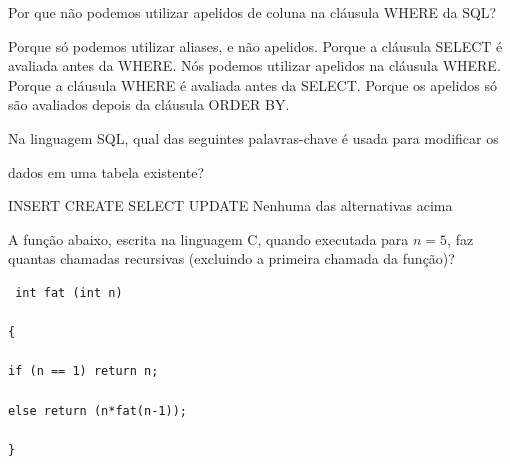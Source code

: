 \documentclass[12pt, addpoints]{exam}
\begin{document}
\begin{questions}
\question

Por que não podemos utilizar apelidos de coluna na cláusula WHERE da SQL?
\begin{choices}
\choice Porque só podemos utilizar aliases, e não apelidos.
\choice Porque a cláusula SELECT é avaliada antes da WHERE.
\choice Nós podemos utilizar apelidos na cláusula WHERE.
\choice Porque a cláusula WHERE é avaliada antes da SELECT.
\choice Porque os apelidos só são avaliados depois da cláusula ORDER BY.
\end{choices}

\question

Na linguagem SQL, qual das seguintes palavras-chave é usada para modificar os

dados em uma tabela existente?


\begin{choices}
\choice INSERT
\choice CREATE
\choice SELECT
\choice UPDATE
\choice Nenhuma das alternativas acima
\end{choices}

\question

A função abaixo, escrita na linguagem C, quando executada para \( n = 5 \), faz quantas chamadas recursivas (excluindo a primeira chamada da função)? 

\begin{verbatim} int fat (int n) 

{ 

if (n == 1) return n; 

else return (n*fat(n-1)); 

} 

\end{verbatim}
\begin{choices}
\end{choices}



    \end{questions}
    
\end{document}
